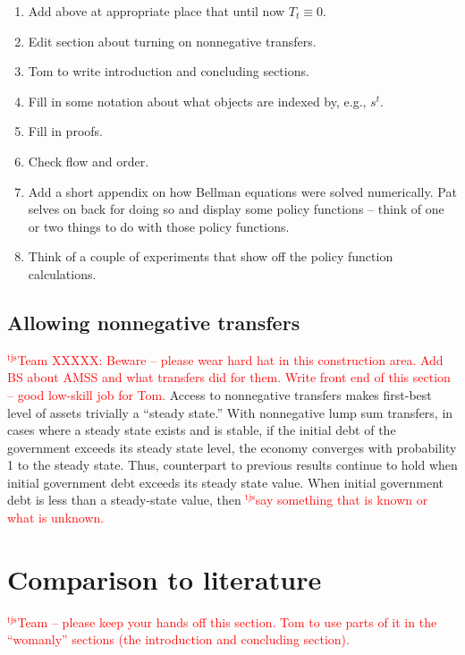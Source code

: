 \documentclass[12pt]{article}
\newcommand{\tjs}[1]{\textcolor{red}{$^{\textrm{tjs}}${#1}}}
\begin{document}
\begin{enumerate}
\item Add above at appropriate place that until now $T_t \equiv 0$.  
\item  Edit  section about turning on nonnegative transfers.  
\item Tom to write introduction and concluding sections.
\item Fill in some notation about what objects are indexed by, e.g., $s^t$.
\item Fill in proofs.
\item Check flow and order.
\item Add a short appendix on how Bellman equations were solved numerically. Pat selves on back for doing so and display
some policy functions -- think of one or two things to do with those policy functions.
\item Think of a couple of experiments that show off the policy function calculations.
\end{enumerate}


\subsection{Allowing nonnegative transfers}
\tjs{Team XXXXX: Beware -- please wear hard hat in this construction area.  Add BS about AMSS and what transfers did for them. Write front end of this section -- good low-skill job for Tom.}
	 Access to nonnegative transfers makes first-best level of assets trivially a ``steady state.''  	
With nonnegative lump sum transfers,  in cases where a steady state exists and is stable,  if the initial debt of the government exceeds its steady state level,  the economy  converges with probability 1 to the steady state. Thus, counterpart to previous  results continue to hold  when
initial government debt exceeds its steady state value.  When initial government debt is less than a steady-state value, then
\tjs{say something that is known or what is unknown.}


\section{Comparison to literature}
\tjs{Team -- please keep your hands off this section. Tom to use parts of it in the ``womanly'' sections (the introduction and
concluding section).}
\end{document}
